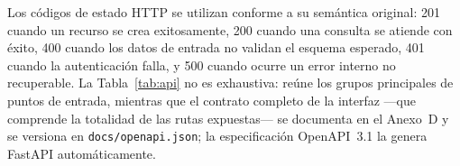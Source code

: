 Los códigos de estado HTTP se utilizan conforme a su semántica original: 201 cuando un recurso se crea exitosamente, 200 cuando una consulta se atiende con éxito, 400 cuando los datos de entrada no validan el esquema esperado, 401 cuando la autenticación falla, y 500 cuando ocurre un error interno no recuperable. La Tabla~\ref{tab:api} no es exhaustiva: reúne los grupos principales de puntos de entrada, mientras que el contrato completo de la interfaz ---que comprende la totalidad de las rutas expuestas--- se documenta en el Anexo~D y se versiona en \texttt{docs/openapi.json}; la especificación OpenAPI~3.1 la genera FastAPI automáticamente.

\newpage
